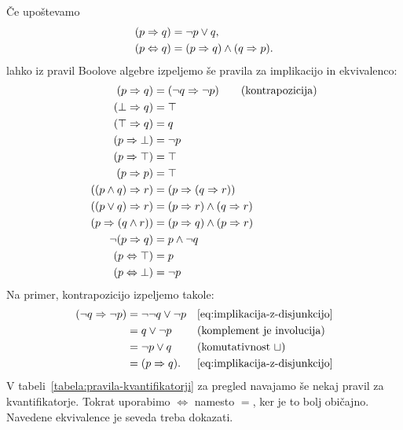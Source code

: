 Če upoštevamo
%
\begin{align}
  (p \Rightarrow q) &= \neg p \lor q, \label{eq:implikacija-z-disjunkcijo} \\
  (p \Leftrightarrow q) &= (p \Rightarrow q) \land (q \Rightarrow p). \label{eq:ekvivalenca-z-implikacijo}
\end{align}
%
lahko iz pravil Boolove algebre izpeljemo še pravila za implikacijo in ekvivalenco:
%
\begin{align}
  (p \Rightarrow q) &= (\neg q \Rightarrow \neg p) \tag{kontrapozicija}\\
  (\bot \Rightarrow q) &= \top \notag \\
  (\top \Rightarrow q) &= q \notag \\
  (p \Rightarrow \bot) &= \neg p \notag \\
  (p \Rightarrow \top) &= \top \notag \\
  (p \Rightarrow p) &= \top \notag \\
  ((p \land q) \Rightarrow r) &= (p \Rightarrow (q \Rightarrow r)) \notag \\
  ((p \lor q) \Rightarrow r) &= (p \Rightarrow r) \land (q \Rightarrow r) \notag \\
  (p \Rightarrow (q \land r)) &= (p \Rightarrow q) \land (p \Rightarrow r) \notag \\
  \neg(p \Rightarrow q) &= p \land \neg q \notag \\
  (p \Leftrightarrow \top) &= p \notag \\
  (p \Leftrightarrow \bot) &= \neg p \notag
\end{align}
%
Na primer, kontrapozicijo izpeljemo takole:
%
\begin{align*}
  (\neg q \Rightarrow \neg p)
  &= \neg\neg q \lor \neg p && \text{\eqref{eq:implikacija-z-disjunkcijo}} \\
  &= q \lor \neg p && \text{(komplement je involucija)} \\
  &= \neg p \lor q && \text{(komutativnost~$\sqcup$)} \\
  &= (p \Rightarrow q). && \text{\eqref{eq:implikacija-z-disjunkcijo}}
\end{align*}
%
V tabeli~\ref{tabela:pravila-kvantifikatorji} za pregled navajamo še nekaj pravil za kvantifikatorje.
%
Tokrat uporabimo $\iff$ namesto $=$, ker je to bolj običajno.
%
Navedene ekvivalence je seveda treba dokazati.
%
